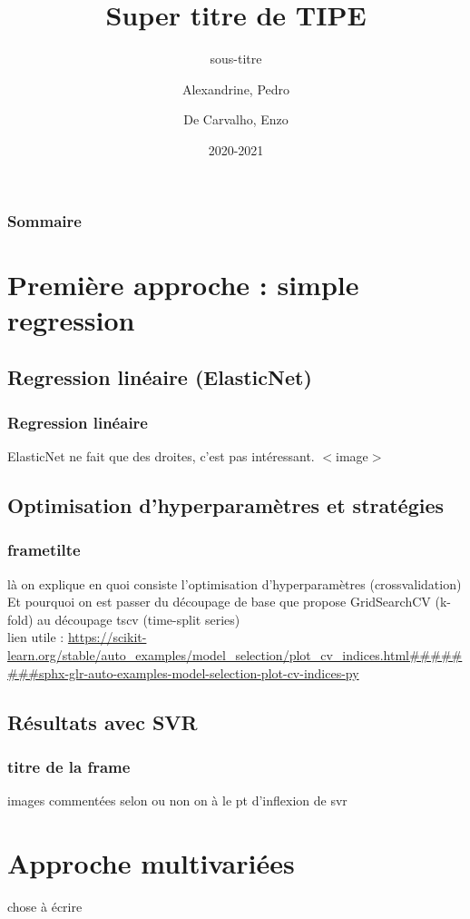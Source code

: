 \documentclass{beamer}
\title{Super titre de TIPE}
\subtitle{sous-titre}
\author{Alexandrine, Pedro\\\and De Carvalho, Enzo}
\date{2020-2021}
\begin{document}
\begin{frame}
	\frametitle{Sommaire}
	\tableofcontents
\end{frame}

\section{Première approche : simple regression}
\subsection{Regression linéaire (ElasticNet)}
\begin{frame}
	\frametitle{Regression linéaire}
	ElasticNet ne fait que des droites, c'est pas intéressant.
$<$image$>$
\end{frame}

\subsection{Optimisation d'hyperparamètres et stratégies}
\begin{frame}
	\frametitle{frametilte}
	là on explique en quoi consiste l'optimisation d'hyperparamètres (crossvalidation)
	Et pourquoi on est passer du découpage de base que propose GridSearchCV (k-fold) au découpage tscv (time-split series)
	\\
	\alert{lien utile : }
	\url{https://scikit-learn.org/stable/auto_examples/model_selection/plot_cv_indices.html########sphx-glr-auto-examples-model-selection-plot-cv-indices-py}
\end{frame}

\subsection{Résultats avec SVR}
\begin{frame}
	\frametitle{titre de la frame}
	images commentées selon ou non on à le pt d'inflexion
	de svr
\end{frame}

\section{Approche multivariées}
\begin{frame}

\end{frame}
	chose à écrire
\end{document}

